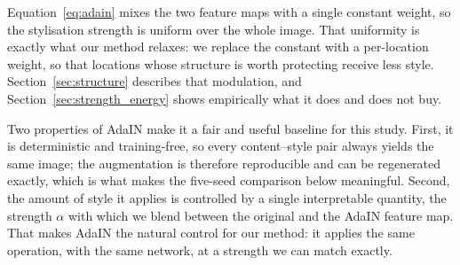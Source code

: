 Equation~\eqref{eq:adain} mixes the two feature maps with a single constant
weight, so the stylisation strength is uniform over the whole image. That
uniformity is exactly what our method relaxes: we replace the constant with
a per-location weight, so that locations whose structure is worth protecting
receive less style. Section~\ref{sec:structure} describes that
modulation, and Section~\ref{sec:strength_energy} shows empirically what it does
and does not buy.

Two properties of AdaIN make it a fair and useful baseline for this study.
First, it is deterministic and training-free, so every content--style pair
always yields the same image; the augmentation is therefore reproducible and
can be regenerated exactly, which is what makes the five-seed comparison
below meaningful. Second, the amount of style it applies is controlled by a
single interpretable quantity, the strength $\alpha$ with which we blend
between the original and the AdaIN feature map. That makes AdaIN the
natural control for our method: it applies the same operation, with the same
network, at a strength we can match exactly.

